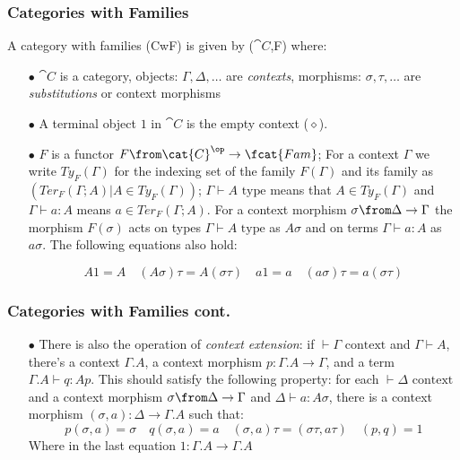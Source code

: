 \documentclass{beamer}
\begin{document}
\begin{frame}

  \frametitle{Categories with Families}

  A category with families (CwF) is given by ($\cat{C}$,F) where:

  \begin{itemize}
    \item[$\bullet$] $\cat{C}$ is a category, objects: $\Gamma, \Delta, \dots$ are
      \emph{contexts}, morphisms:  $\sigma, \tau, \dots$ are
      \emph{substitutions} or context morphisms

    \item[$\bullet$] A terminal object $1$ in $\cat{C}$ is the empty context ($\diamond$).

    \item[$\bullet$] $F$ is a functor $F\from \cat{C}^\op \to \fcat{Fam}$; For a context
      $\Gamma$ we write $Ty_F(\Gamma)$ for the indexing set of the family
      $F(\Gamma)$ and its family as $(Ter_F(\Gamma;A) | A \in Ty_F(\Gamma))$;
      $\Gamma \vdash A \text{ type}$ means that $A \in Ty_F(\Gamma)$ and
      $\Gamma \vdash a : A$ means $a \in Ter_F(\Gamma;A)$. For a context
      morphism $\sigma \from \Delta \to \Gamma$ the morphism $F(\sigma)$
      acts on types $\Gamma \vdash A \text{ type}$ as $A\sigma$ and on terms
      $\Gamma \vdash a : A$ as $a\sigma$. The following equations also hold:

    \[
      A1=A \quad (A\sigma)\tau = A(\sigma\tau) \quad a1=a \quad (a\sigma)\tau=a(\sigma\tau)
    \]

  \end{itemize}

\end{frame}

\begin{frame}
  \frametitle{Categories with Families cont.}

  \begin{itemize}
    \item[$\bullet$] There is also the operation of \emph{context extension}:
      if $\vdash \Gamma \text{ context}$ and $\Gamma \vdash A$, there's a
      context $\Gamma.A$, a context morphism $p: \Gamma.A \to \Gamma$, and a
      term $\Gamma.A \vdash q : A p$. This should satisfy the following
      property: for each $\vdash \Delta \text{ context}$ and a context morphism
      $\sigma \from \Delta \to \Gamma$ and $\Delta \vdash a : A \sigma$, there
      is a context morphism $(\sigma, a): \Delta \to \Gamma.A$ such that:
    \[
      p(\sigma, a) = \sigma \quad q(\sigma, a) = a \quad (\sigma, a) \tau =
      (\sigma \tau, a \tau) \quad (p, q) = 1
    \]
    Where in the last equation $1: \Gamma.A \to \Gamma.A$
  \end{itemize}
\end{frame}
\end{document}
